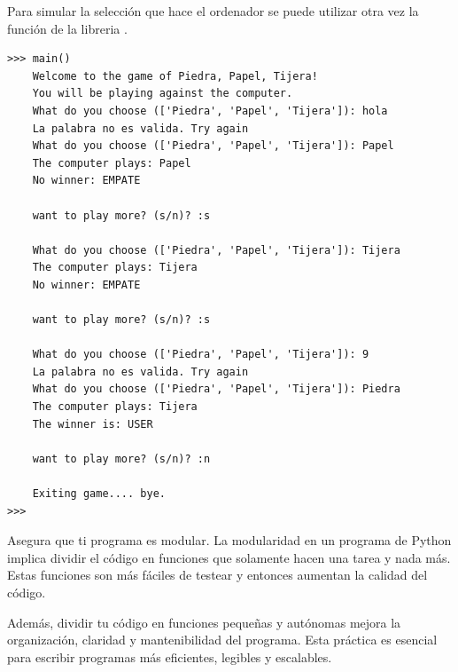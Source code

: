 \begin{ejercicio}
Para simular la selección que hace el ordenador se puede utilizar otra vez la función
 de la libreria .\\

\begin{Verbatim}[frame=single, label={\em example test execution of the program}]
>>> main()
    Welcome to the game of Piedra, Papel, Tijera!
    You will be playing against the computer.
    What do you choose (['Piedra', 'Papel', 'Tijera']): hola
    La palabra no es valida. Try again
    What do you choose (['Piedra', 'Papel', 'Tijera']): Papel
    The computer plays: Papel
    No winner: EMPATE

    want to play more? (s/n)? :s
    
    What do you choose (['Piedra', 'Papel', 'Tijera']): Tijera
    The computer plays: Tijera
    No winner: EMPATE

    want to play more? (s/n)? :s
    
    What do you choose (['Piedra', 'Papel', 'Tijera']): 9
    La palabra no es valida. Try again
    What do you choose (['Piedra', 'Papel', 'Tijera']): Piedra
    The computer plays: Tijera
    The winner is: USER

    want to play more? (s/n)? :n
    
    Exiting game.... bye.
>>>
\end{Verbatim}


Asegura que ti programa es modular. La modularidad en un programa de Python implica dividir el código en funciones que solamente hacen una tarea y nada más. Estas funciones son más fáciles de testear y entonces aumentan la calidad del código. 

Además, dividir tu código en funciones pequeñas y autónomas mejora la organización, claridad y mantenibilidad del programa. Esta práctica es esencial para escribir programas más eficientes, legibles y escalables.

\end{ejercicio}

